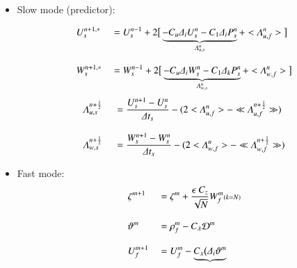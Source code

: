 \documentclass[a4paper,11pt]{article}
\begin{document}
\begin{itemize}[label=\textbullet,font=\tiny]

\item Slow mode (predictor):
    
\begin{equation}
   \begin{split}
   \displaystyle
    &U_s^{n+1,*} &&= U_s^{n-1}+2\big[
     \underbrace{-C_u\Delta_i{U_s^{n}}-C_1\Delta_i{P_s^{n}}}
     _{\Lambda_{u,s}^{n}}
    +<\Lambda_{u,f}^{n}>\big]\\[3mm]
    &W_s^{n+1,*} &&= W_s^{n-1}+2\big[
    \underbrace{-C_u\Delta_i{W_s^{n}}-C_1\Delta_k{P_s^{n}}}
     _{\Lambda_{w,s}^{n}}
    +<\Lambda_{w,f}^{n}>\big]
   \end{split}
   \end{equation}
    \begin{equation}
    \label{}
    \begin{split}
    \displaystyle
      & \Lambda_{u,s}^{n+\frac{1}{2}}\ &&= \frac{U_{s}^{n+1}-U_{s}^{n}}{\Delta t_s}
        - \Huge(2<\Lambda_{u,f}^{n}>-\ll\Lambda_{u,f}^{n+\frac{1}{2}}\gg\Huge)\\[3mm]
      & \Lambda_{w,s}^{n+\frac{1}{2}}\ &&= \frac{W_{s}^{n+1}-W_{s}^{n}}{\Delta t_s}
        - \Huge(2<\Lambda_{w,f}^{n}>-\ll\Lambda_{w,f}^{n+\frac{1}{2}}\gg\Huge)
    \end{split}
    \end{equation}
   \item Fast mode:
   \begin{equation}
   \begin{split}
   \displaystyle
    &\zeta^{m+1}&&=\zeta^{m}
    +\frac{\epsilon\ C_{z}}{\sqrt{N}} W_{f}^{m}\scriptstyle(k=N)\textstyle\\[3mm]
    &\vartheta^m &&=\rho_f^m-C_\lambda{\mathcal{D}}^m\\[3mm]
    &U_f^{m+1} &&=U_f^{m}
    -\underbrace{C_x\big(\Delta_i\vartheta^{m}
}
\end{split}
\end{equation}
\end{itemize}
\end{document}
